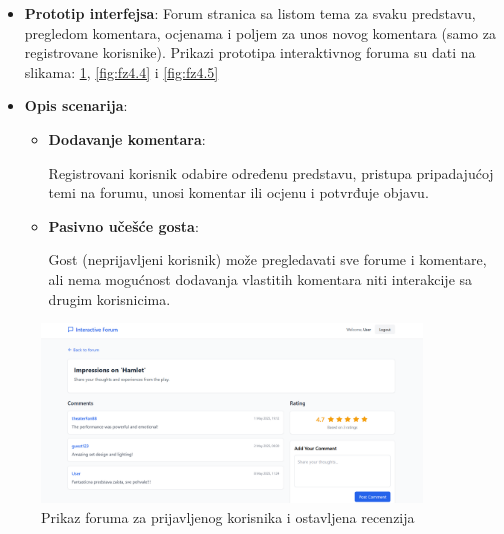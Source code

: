 \begin{itemize}
    \item \textbf{Prototip interfejsa}: Forum stranica sa listom tema za svaku predstavu, pregledom komentara, ocjenama i poljem za unos novog komentara (samo za registrovane korisnike). Prikazi prototipa interaktivnog foruma su dati na slikama: \ref{fig:fz4.3}, \ref{fig:fz4.4} i \ref{fig:fz4.5}
    \item \textbf{Opis scenarija}:
    \begin{itemize}
        \item \textbf{Dodavanje komentara}: 

        
        Registrovani korisnik odabire određenu predstavu, pristupa pripadajućoj temi na forumu, unosi komentar ili ocjenu i potvrđuje objavu.
        
        \item \textbf{Pasivno učešće gosta}: 

        
        Gost (neprijavljeni korisnik) može pregledavati sve forume i komentare, ali nema mogućnost dodavanja vlastitih komentara niti interakcije sa drugim korisnicima.
    \end{itemize}
\end{itemize}

\begin{figure}[H]
    \centering
    \includegraphics[width=0.9\textwidth]{Slike/fz4.3.png}
    \caption{Prikaz foruma za prijavljenog korisnika i ostavljena recenzija}
    \label{fig:fz4.3}
\end{figure}

